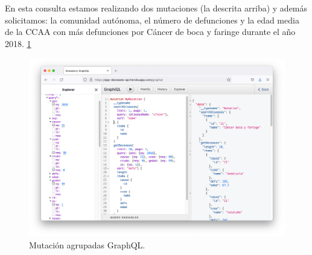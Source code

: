 En esta consulta estamos realizando dos mutaciones (la descrita arriba) y además solicitamos: la comunidad autónoma,
el número de defunciones y la edad media de la CCAA con más defunciones por Cáncer de boca
y faringe durante el año 2018. \ref{fig:6}
\FloatBarrier
\begin{figure}[h]
	\centering
	\includegraphics[width=\textwidth]{doc/logos/imgs/ejemplo5.png}
	\caption{ Mutación agrupadas GraphQL. }
		\label{fig:6}
\end{figure}
\FloatBarrier
